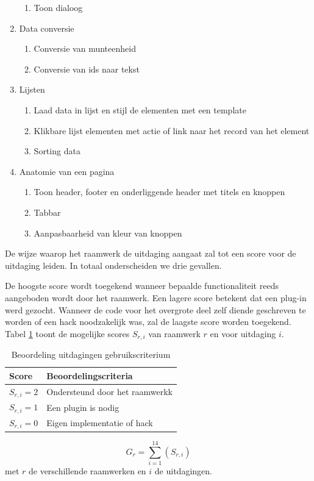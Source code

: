 \begin{enumerate}[label*=U \arabic*.]
\begin{enumerate}
\item Toon dialoog
\end{enumerate}
\item \label{challenge:conversie}Data conversie
\begin{enumerate}
\item Conversie van munteenheid
\item Conversie van ids naar tekst	
\end{enumerate}
\item \label{challenge:lijsten}Lijsten
\begin{enumerate}
\item Laad data in lijst en stijl de elementen met een template
\item Klikbare lijst elementen met actie of link naar het record van het element
\item Sorting data
\end{enumerate}
\item \label{challenge:anatomie}Anatomie van een pagina
\begin{enumerate}
 \item Toon header,  footer en onderliggende header met titels en knoppen
 \item Tabbar
 \item Aanpasbaarheid van kleur van knoppen
 \end{enumerate}
\end{enumerate} 

De wijze waarop het raamwerk de uitdaging aangaat zal tot een score voor de uitdaging leiden.
In totaal onderscheiden we drie gevallen.

De hoogste score wordt toegekend wanneer bepaalde functionaliteit reeds aangeboden wordt door het raamwerk. 
Een lagere score betekent dat een plug-in werd gezocht. 
Wanneer de code voor het overgrote deel zelf diende geschreven te worden of een hack noodzakelijk was, zal de laagste score worden toegekend.
Tabel \ref{tabel:scores-uitdagingen} toont de mogelijke scores $S_{r,i}$ van raamwerk $r$ en voor uitdaging $i$.
\begin{table}[h]	
  \centering
  \begin{tabular}{ll}
    \toprule
    \textbf{Score} & \textbf{Beoordelingscriteria}\\
    \midrule
    $S_{r,i} = 2$ & Ondersteund door het raamwerkk\\
    $S_{r,i} = 1$ & Een plugin is nodig\\
    $S_{r,i} = 0$ & Eigen implementatie of hack\\
    \bottomrule
  \end{tabular}
  \caption{Beoordeling uitdagingen gebruikscriterium}
  \label{tabel:scores-uitdagingen}
\end{table}
\begin{equation}
  G_r = \sum_{i=1}^{14}{\left(S_{r,i}\right)}
  \label{eq:gebruik}
\end{equation}
met $r$ de verschillende raamwerken en $i$ de uitdagingen.

